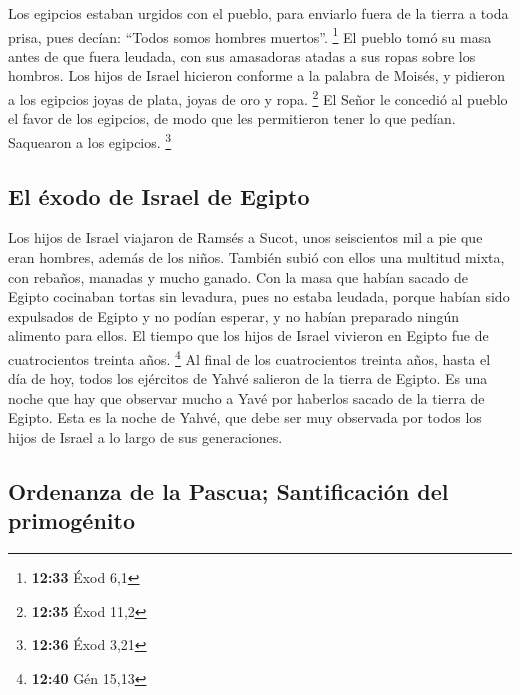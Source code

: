 Los egipcios estaban urgidos con el pueblo, para
enviarlo fuera de la tierra a toda prisa, pues decían: ``Todos somos
hombres muertos''. \footnote{\textbf{12:33} Éxod 6,1}  El
pueblo tomó su masa antes de que fuera leudada, con sus amasadoras
atadas a sus ropas sobre los hombros.  Los hijos de
Israel hicieron conforme a la palabra de Moisés, y pidieron a los
egipcios joyas de plata, joyas de oro y ropa. \footnote{\textbf{12:35}
  Éxod 11,2}  El Señor le concedió al pueblo el favor de
los egipcios, de modo que les permitieron tener lo que pedían. Saquearon
a los egipcios. \footnote{\textbf{12:36} Éxod 3,21}

\hypertarget{el-uxe9xodo-de-israel-de-egipto}{%
\subsection{El éxodo de Israel de
Egipto}\label{el-uxe9xodo-de-israel-de-egipto}}

 Los hijos de Israel viajaron de Ramsés a Sucot, unos
seiscientos mil a pie que eran hombres, además de los niños.
 También subió con ellos una multitud mixta, con rebaños,
manadas y mucho ganado.  Con la masa que habían sacado de
Egipto cocinaban tortas sin levadura, pues no estaba leudada, porque
habían sido expulsados de Egipto y no podían esperar, y no habían
preparado ningún alimento para ellos.  El tiempo que los
hijos de Israel vivieron en Egipto fue de cuatrocientos treinta años.
\footnote{\textbf{12:40} Gén 15,13}  Al final de los
cuatrocientos treinta años, hasta el día de hoy, todos los ejércitos de
Yahvé salieron de la tierra de Egipto.  Es una noche que
hay que observar mucho a Yavé por haberlos sacado de la tierra de
Egipto. Esta es la noche de Yahvé, que debe ser muy observada por todos
los hijos de Israel a lo largo de sus generaciones.

\hypertarget{ordenanza-de-la-pascua-santificaciuxf3n-del-primoguxe9nito}{%
\subsection{Ordenanza de la Pascua; Santificación del
primogénito}\label{ordenanza-de-la-pascua-santificaciuxf3n-del-primoguxe9nito}}

